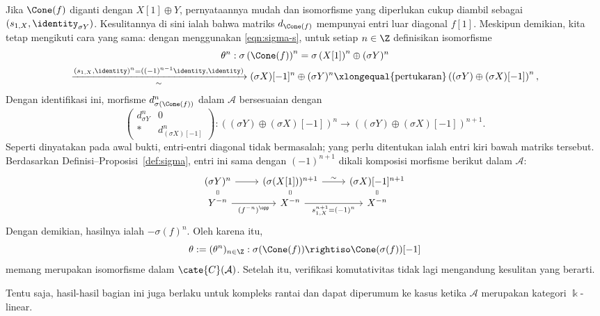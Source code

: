 \begin{bukti}
	Jika $\Cone(f)$ diganti dengan $X[1]\oplus Y$, pernyataannya mudah dan
	isomorfisme yang diperlukan cukup diambil sebagai
	$(s_{1,X},\identity_{\sigma Y})$. Kesulitannya di sini ialah bahwa matriks
	$d_{\Cone(f)}$ mempunyai entri luar diagonal $f[1]$. Meskipun demikian,
	kita tetap mengikuti cara yang sama: dengan menggunakan
	\eqref{eqn:sigma-s}, untuk setiap $n\in\Z$ definisikan isomorfisme
	\begin{multline*}
		\theta^n: \sigma\left(\Cone(f)\right)^n = \sigma\left(X[1]\right)^n \oplus (\sigma Y)^n \\
		\xrightarrow[\sim]{(s_{1,X}, \identity)^n = ((-1)^{n-1} \identity, \identity) } (\sigma X)[-1]^n \oplus (\sigma Y)^n \xlongequal{\text{pertukaran}} \left( (\sigma Y) \oplus (\sigma X)[-1] \right)^n ,
	\end{multline*}	
	Dengan identifikasi ini, morfisme $d_{\sigma(\Cone(f))}^n$ dalam
	$\mathcal{A}$ bersesuaian dengan
	\[ \begin{pmatrix}
		d_{\sigma Y}^n & 0 \\
		* & d_{(\sigma X)[-1]}^n
	\end{pmatrix} : \left( (\sigma Y) \oplus (\sigma X)[-1] \right)^n \to \left( (\sigma Y) \oplus (\sigma X)[-1] \right)^{n+1} . \]
	Seperti dinyatakan pada awal bukti, entri-entri diagonal tidak bermasalah;
	yang perlu ditentukan ialah entri kiri bawah matriks tersebut. Berdasarkan
	Definisi--Proposisi~\ref{def:sigma}, entri ini sama dengan $(-1)^{n+1}$
	dikali komposisi morfisme berikut dalam $\mathcal{A}$:
	\[\begin{tikzcd}[row sep=tiny]
		(\sigma Y)^n \arrow[r] & (\sigma(X[1]))^{n+1} \arrow[r, "\sim"] & (\sigma X)[-1]^{n+1} \\
		Y^{-n} \arrow[equal, u] \arrow[r, "{(f^{-n})^{\opp}}"'] & X^{-n} \arrow[equal, u] \arrow[r, "{s_{1, X}^{n+1} = (-1)^n}"'] & X^{-n} \arrow[equal, u]
	\end{tikzcd}\]
	Dengan demikian, hasilnya ialah $-\sigma(f)^n$. Oleh karena itu,
	\[ \theta := (\theta^n)_{n \in \Z}: \sigma(\Cone(f)) \rightiso \Cone(\sigma(f))[-1] \]
	memang merupakan isomorfisme dalam $\cate{C}(\mathcal{A})$. Setelah itu,
	verifikasi komutativitas tidak lagi mengandung kesulitan
	yang berarti.
\end{bukti}

Tentu saja, hasil-hasil bagian ini juga berlaku untuk kompleks rantai dan
dapat diperumum ke kasus ketika $\mathcal{A}$ merupakan kategori
$\Bbbk$-linear.

